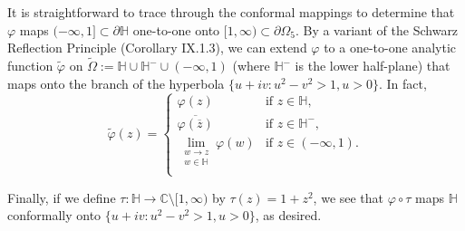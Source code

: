 \documentclass[11pt]{book}
\theoremstyle{definition}
\begin{document}
\begin{enumerate}
      It is straightforward to trace through the conformal mappings to determine that $\varphi$ maps $(-\infty, 1] \subset \partial \mathbb H$ one-to-one onto $[1, \infty) \subset \partial \Omega_5$.  By a variant of the Schwarz Reflection Principle (Corollary IX.1.3), we can extend $\varphi$ to a one-to-one analytic function $\widetilde \varphi$ on $\widetilde \Omega := \mathbb H \cup \mathbb H^- \cup (-\infty, 1)$ (where $\mathbb H^-$ is the lower half-plane) that maps onto the branch of the hyperbola $\{ u + iv : u^2 - v^2 > 1, u > 0 \}$.  In fact, 
      \[ \widetilde \varphi(z) = \begin{cases}
            \varphi(z) & \text{if $z\in \mathbb H$,}\\
            \overline{\varphi(\overline z)} & \text{if $z\in \mathbb H^-$,}\\
            \lim_{\substack{w \rightarrow z\\w \in \mathbb H}} \varphi(w) & \text{if $z\in (-\infty, 1)$.}\\
        \end{cases}
        \] 

        Finally, if we define $\tau : \mathbb H \rightarrow \mathbb C \setminus [1,\infty)$  by $\tau(z) = 1+z^2$, we see that $\varphi \circ \tau$ maps $\mathbb H$ conformally onto $\{ u + iv : u^2 -v^2 > 1, u > 0 \}$, as desired. 





\end{enumerate}
\end{document}
